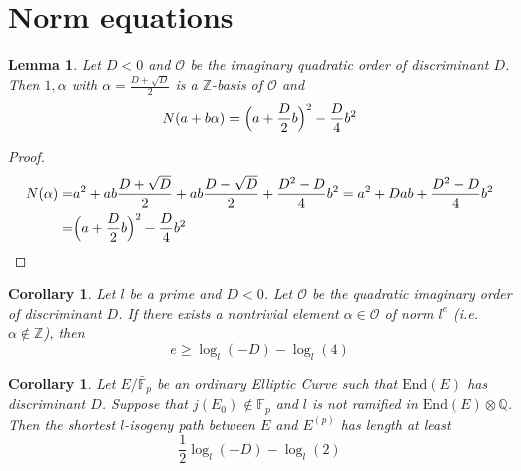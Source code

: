 \documentclass{scrartcl}
\newcommand{\Z}{\mathbb{Z}}
\newcommand{\F}{\mathbb{F}}
\newcommand{\End}{\mathrm{End}}
\renewcommand{\O}{\mathcal{O}}
\newtheorem{lemma}[prop]{Lemma}
\newtheorem{corollary}[prop]{Corollary}
\theoremstyle{definition}
\begin{document}
\section{Norm equations}
\begin{lemma}
    Let $D < 0$ and $\O$ be the imaginary quadratic order of discriminant $D$.
    Then $1, \alpha$ with $\alpha = \frac {D + \sqrt{D}} 2$ is a $\Z$-basis of $\O$ and
    \begin{equation*}
        N(a + b\alpha) = \Bigl(a + \frac D 2 b\Bigr)^2 - \frac D 4 b^2
    \end{equation*}
\end{lemma}
\begin{proof}
    \begin{align*}
        N(\alpha) =& a^2 + ab \frac {D + \sqrt{D}} 2 + ab \frac {D - \sqrt{D}} 2 + \frac {D^2 - D} 4 b^2 = a^2 + Dab + \frac {D^2 - D} 4 b^2 \\
        =& \Bigl(a + \frac D 2 b\Bigr)^2 - \frac D 4 b^2
    \end{align*}
\end{proof}
\begin{corollary}
    Let $l$ be a prime and $D < 0$.
    Let $\O$ be the quadratic imaginary order of discriminant $D$.
    If there exists a nontrivial element $\alpha \in \O$ of norm $l^e$ (i.e. $\alpha \notin \Z$), then
    \begin{equation*}
        e \geq \log_l(-D) - \log_l(4)
    \end{equation*} 
\end{corollary}
\begin{corollary}
    Let $E/\bar{\F}_p$ be an ordinary Elliptic Curve such that $\End(E)$ has discriminant $D$.
    Suppose that $j(E_0) \notin \F_p$ and $l$ is not ramified in $\End(E) \otimes \mathbb{Q}$.
    Then the shortest $l$-isogeny path between $E$ and $E^{(p)}$ has length at least
    \begin{equation*}
        \frac 1 2 \log_l(-D) - \log_l(2)
    \end{equation*}
\end{corollary}
\end{document}
